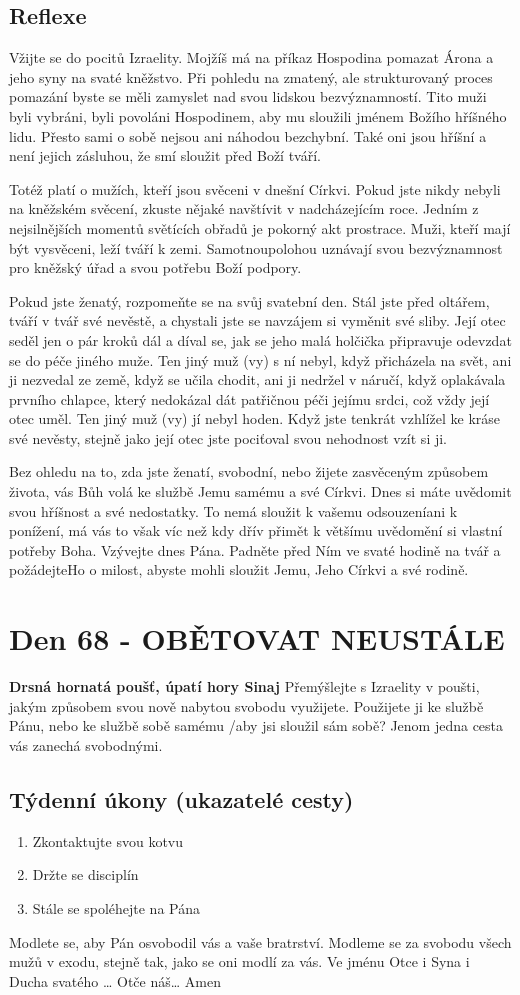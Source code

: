 \documentclass[11pt]{article}
\newcommand{\zacatekDesatyTyden}{
\textbf{Drsná hornatá poušť, úpatí hory Sinaj} \newline 
Přemýšlejte s Izraelity v poušti, jakým způsobem svou nově nabytou svobodu využijete. Použijete ji ke službě Pánu, nebo ke službě sobě samému /aby jsi sloužil sám sobě? Jenom jedna cesta vás zanechá svobodnými.

\subsection*{Týdenní úkony (ukazatelé cesty)}
\begin{enumerate}
  \item Zkontaktujte svou kotvu
  \item Držte se disciplín
  \item Stále se spoléhejte na Pána
\end{enumerate}
Modlete se, aby Pán osvobodil vás a vaše bratrství. \newline
Modleme se za svobodu všech mužů v exodu, stejně tak, jako se oni modlí za vás.\newline
Ve jménu Otce i Syna i Ducha svatého …  Otče náš… Amen
}
\begin{document}
\subsection*{Reflexe}
Vžijte se do pocitů Izraelity. Mojžíš má na příkaz Hospodina pomazat Árona a jeho syny na svaté kněžstvo. Při
pohledu na zmatený, ale strukturovaný proces pomazání byste se měli zamyslet nad svou lidskou bezvýznamností. Tito
muži byli vybráni, byli povoláni Hospodinem, aby mu sloužili jménem Božího hříšného lidu. Přesto sami o sobě nejsou
ani náhodou bezchybní. Také oni jsou hříšní a není jejich zásluhou, že smí sloužit před Boží tváří.

Totéž platí o mužích, kteří jsou svěceni v dnešní Církvi. Pokud jste nikdy nebyli na kněžském svěcení, zkuste nějaké
navštívit v nadcházejícím roce. Jedním z nejsilnějších momentů světících obřadů je pokorný akt prostrace. Muži, kteří
mají být vysvěceni, leží tváří k zemi. Samotnoupolohou uznávají svou bezvýznamnost pro kněžský úřad a svou potřebu
Boží podpory.

Pokud jste ženatý, rozpomeňte se na svůj svatební den. Stál jste před oltářem, tváří v tvář své nevěstě, a chystali jste se
navzájem si vyměnit své sliby. Její otec seděl jen o pár kroků dál a díval se, jak se jeho malá holčička připravuje
odevzdat se do péče jiného muže. Ten jiný muž (vy) s ní nebyl, když přicházela na svět, ani ji nezvedal ze země, když
se učila chodit, ani ji nedržel v náručí, když oplakávala prvního chlapce, který nedokázal dát patřičnou péči jejímu
srdci, což vždy její otec uměl. Ten jiný muž (vy) jí nebyl hoden. Když jste tenkrát vzhlížel ke kráse své nevěsty, stejně
jako její otec jste pociťoval svou nehodnost vzít si ji.

Bez ohledu na to, zda jste ženatí, svobodní, nebo žijete zasvěceným způsobem života, vás Bůh volá ke službě Jemu
samému a své Církvi. Dnes si máte uvědomit svou hříšnost a své nedostatky. To nemá sloužit k vašemu odsouzeníani k
ponížení, má vás to však víc než kdy dřív přimět k většímu uvědomění si vlastní potřeby Boha. Vzývejte dnes Pána.
Padněte před Ním ve svaté hodině na tvář a požádejteHo o milost, abyste mohli sloužit Jemu, Jeho Církvi a své rodině.





\newpage
\section{Den 68 - OBĚTOVAT NEUSTÁLE}
\zacatekDesatyTyden
\end{document}

